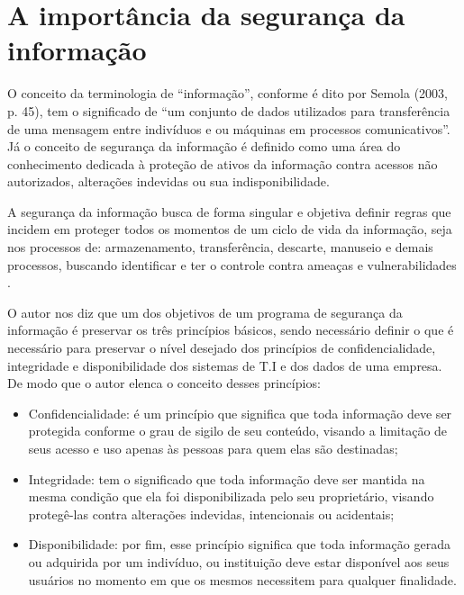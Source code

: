 \documentclass[
	12pt,				%
	openright,			%
	oneside,			%
	a4paper,			%
	english,			%
	french,				%
	spanish,			%
	brazil,				%
	]{abntex2}
\begin{document}
\section{A importância da segurança da informação }

O conceito da terminologia de “informação”, conforme é dito por Semola (2003, p. 45), tem o significado de “um conjunto de dados utilizados para transferência de uma mensagem entre indivíduos e ou máquinas em processos comunicativos”. Já o conceito de segurança da informação é definido como uma área do conhecimento dedicada à proteção de ativos da informação contra acessos não autorizados, alterações indevidas ou sua indisponibilidade. 

A segurança da informação busca de forma singular e objetiva definir regras que incidem em proteger todos os momentos de um ciclo de vida da informação, seja nos processos de: armazenamento, transferência, descarte, manuseio e demais processos, buscando identificar e ter o controle contra ameaças e vulnerabilidades \cite{Semola2003}.

O autor  nos diz que um dos objetivos de um programa de segurança da informação é preservar os três princípios básicos, sendo necessário definir o que é necessário para preservar o nível desejado dos princípios de confidencialidade, integridade e disponibilidade dos sistemas de T.I e dos dados de uma empresa. De modo que o autor  elenca o conceito desses princípios:

\begin{itemize}
\item Confidencialidade: é um princípio que significa que toda informação deve ser protegida conforme o grau de sigilo de seu conteúdo, visando a limitação de seus acesso e uso apenas às pessoas para quem elas são destinadas;
\item Integridade: tem o significado que toda informação deve ser mantida na mesma condição que ela foi disponibilizada pelo seu proprietário, visando protegê-las contra alterações indevidas, intencionais ou acidentais;
\item Disponibilidade: por fim, esse princípio significa que toda informação gerada ou adquirida por um indivíduo, ou instituição deve estar disponível aos seus usuários no momento em que os mesmos necessitem para qualquer finalidade.
\end{itemize}
\end{document}
